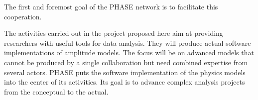 The first and foremost goal of the PHASE network is to facilitate this cooperation. 

The activities carried out in the project proposed here aim at providing researchers with useful tools for data analysis. They will produce actual software implementations of amplitude models. The focus will be on advanced models that cannot be produced by a single collaboration but need combined expertise from several actors. PHASE puts the software implementation of the physics models into the center of its activities. Its goal is to advance complex analysis projects from the conceptual to the actual.





